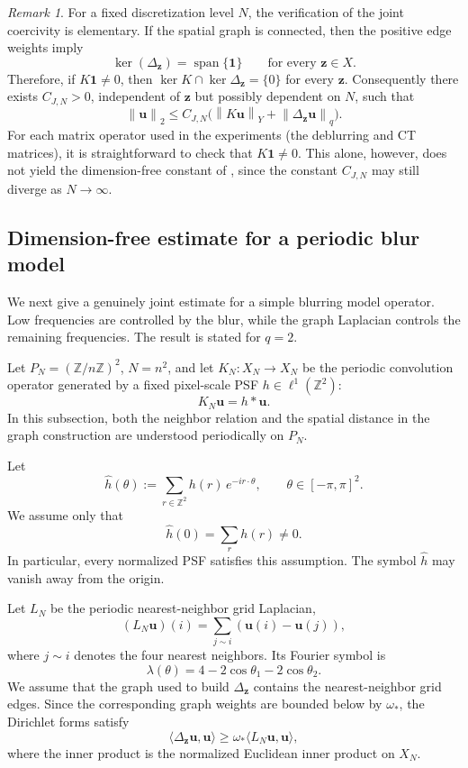 \documentclass{article}
\theoremstyle{remark}
\newtheorem{remark}[theorem]{Remark}
\newcommand{\norm}[1]{\left\lVert #1 \right\rVert}
\newcommand{\bz}{{\bm{z}}}
\newcommand{\bu}{{\bm{u}}}
\newcommand{\bone}{\mathbf{1}}
\begin{document}
\begin{remark}\label{rem:finite-dim-coercivity}
For a fixed discretization level $N$, the verification of the joint coercivity is elementary. If the spatial graph is connected, then the positive edge weights imply
\[
\ker(\Delta_\bz)=\operatorname{span}\{\bone\}
\qquad \text{for every }\bz\in X.
\]
Therefore, if $K\bone\ne0$, then $\ker K\cap\ker\Delta_\bz=\{0\}$ for every $\bz$.
Consequently there exists $C_{J,N}>0$, independent of $\bz$ but possibly
dependent on $N$, such that
\[
\norm{\bu}_2\le C_{J,N}\bigl(\norm{K\bu}_Y+\norm{\Delta_\bz\bu}_q\bigr).
\]
For each matrix operator used in the experiments (the deblurring and CT
matrices), it is straightforward to check that $K\bone\ne0$. This alone,
however, does not yield the dimension-free constant of ,
since the constant $C_{J,N}$ may still diverge as $N\to\infty$.
\end{remark}

\subsection{Dimension-free estimate for a periodic blur model}\label{sec:appendix-deblurring}

We next give a genuinely joint estimate for a simple blurring model operator. Low frequencies are controlled by the blur, while the graph Laplacian controls the remaining frequencies. The result is stated for $q=2$.

Let $P_N=(\mathbb Z/n\mathbb Z)^2$, $N=n^2$, and let $K_N\colon X_N\to X_N$ be the periodic convolution operator generated by a fixed pixel-scale PSF $h\in\ell^1(\mathbb Z^2)$:
\[
K_N\bu=h*\bu.
\]
In this subsection, both the neighbor relation and the spatial distance in the
graph construction are understood periodically on $P_N$.

Let
\[
\widehat h(\theta):=\sum_{r\in\mathbb Z^2}h(r)\,e^{-ir\cdot\theta},
\qquad \theta\in[-\pi,\pi]^2.
\]
We assume only that
\[
\widehat h(0)=\sum_r h(r)\ne0.
\]
In particular, every normalized PSF satisfies this assumption. The symbol $\widehat h$ may vanish away from the origin.

Let $L_N$ be the periodic nearest-neighbor grid Laplacian,
\[
(L_N\bu)(i)=\sum_{j\sim i}(\bu(i)-\bu(j)),
\]
where $j\sim i$ denotes the four nearest neighbors. Its Fourier symbol is
\[
\lambda(\theta)=4-2\cos\theta_1-2\cos\theta_2.
\]
We assume that the graph used to build $\Delta_\bz$ contains the nearest-neighbor grid edges. Since the corresponding graph weights are bounded below by $\omega_*$, the Dirichlet forms satisfy
\begin{equation}\label{eq:graph-form-comparison}
\langle \Delta_\bz\bu,\bu\rangle
\ge \omega_*\langle L_N\bu,\bu\rangle,
\end{equation}
where the inner product is the normalized Euclidean inner product on $X_N$.
\end{document}
